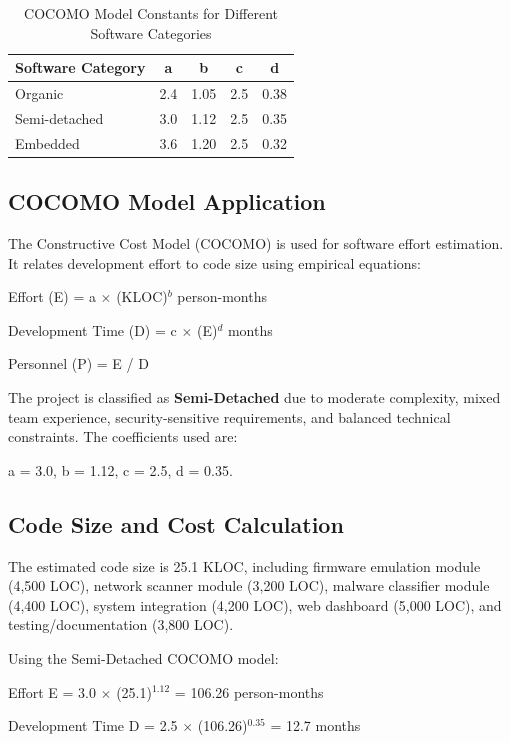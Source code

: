 \begin{table}[htbp]
	\centering
	\caption{COCOMO Model Constants for Different Software Categories}
	\label{tab:cocomo_constants}
	\begin{tabular}{|l|c|c|c|c|}
		\hline
		\textbf{Software Category} & \textbf{a} & \textbf{b} & \textbf{c} & \textbf{d} \\
		\hline
		Organic & 2.4 & 1.05 & 2.5 & 0.38 \\
		\hline
		Semi-detached & 3.0 & 1.12 & 2.5 & 0.35 \\
		\hline
		Embedded & 3.6 & 1.20 & 2.5 & 0.32 \\
		\hline
	\end{tabular}
\end{table}

\subsection{COCOMO Model Application}

The Constructive Cost Model (COCOMO) is used for software effort estimation. It relates development effort to code size using empirical equations:

Effort (E) = a $\times$ (KLOC)$^b$ person-months  

Development Time (D) = c $\times$ (E)$^d$ months  

Personnel (P) = E / D  

The project is classified as \textbf{Semi-Detached} due to moderate complexity, mixed team experience, security-sensitive requirements, and balanced technical constraints. The coefficients used are:

a = 3.0, b = 1.12, c = 2.5, d = 0.35.

\subsection{Code Size and Cost Calculation}

The estimated code size is 25.1 KLOC, including firmware emulation module (4,500 LOC), network scanner module (3,200 LOC), malware classifier module (4,400 LOC), system integration (4,200 LOC), web dashboard (5,000 LOC), and testing/documentation (3,800 LOC).

Using the Semi-Detached COCOMO model:

Effort E = 3.0 $\times$ (25.1)$^{1.12}$ = 106.26 person-months  

Development Time D = 2.5 $\times$ (106.26)$^{0.35}$ = 12.7 months  

